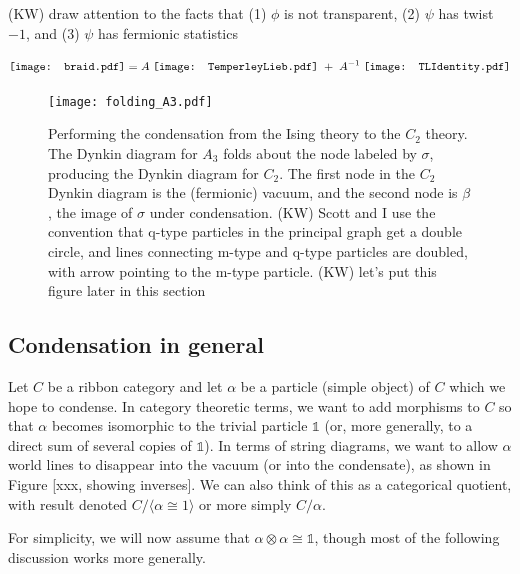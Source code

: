 \documentclass[12pt,a4paper]{article}
\newcounter{arrow}
\newcommand{\unit}{\mathds{1}}
\newcommand{\kw}[1]{{\color{kwcolor}\footnotesize{(KW) #1}}}
\begin{document}
\medskip

\kw{draw attention to the facts that (1) $\phi$ is not transparent, (2) $\psi$ has twist $-1$, 
and (3) $\psi$ has fermionic statistics}






\newcommand{\braid}{\mathord{\vcenter{\hbox{\texttt{[image: braid.pdf]}}}}}
\newcommand{\TLIdentity}{\mathord{\vcenter{\hbox{\texttt{[image: TLIdentity.pdf]}}}}}
\newcommand{\TemperleyLieb}{\mathord{\vcenter{\hbox{\texttt{[image: TemperleyLieb.pdf]}}}}}
  
\begin{align}
\braid = A\;  \TemperleyLieb \; +\;  A^{-1}\;  \TLIdentity
\end{align}

\begin{figure}
\texttt{[image: folding\_A3.pdf]}
\caption{Performing the condensation from the Ising theory to the $C_2$ theory. The Dynkin diagram for $A_3$ folds about the node labeled by $\sigma$, producing the Dynkin diagram 
for $C_2$. The first node in the $C_2$ Dynkin diagram is the (fermionic) vacuum, and the second node is $\beta$, the image of $\sigma$ under condensation.
\kw{Scott and I use the convention that q-type particles in the principal graph get a double circle, and lines connecting
m-type and q-type particles are doubled, with arrow pointing to the m-type particle.}
\kw{let's put this figure later in this section}
} 
\end{figure}



\subsection{Condensation in general}

Let $C$ be a ribbon category and let $\alpha$ be a particle (simple object) of $C$ which we hope to condense.
In category theoretic terms, we want to add morphisms to $C$ so that $\alpha$ becomes
isomorphic to the trivial particle $\unit$ (or, more generally, to a direct sum of several copies of $\unit$).
In terms of string diagrams, we want to allow $\alpha$ world lines to disappear into the vacuum (or into
the condensate), as shown in Figure [xxx, showing inverses].
We can also think of this as a categorical quotient, with result denoted $C/\langle \alpha \cong 1 \rangle$ or
more simply $C/\alpha$.

For simplicity, we will now assume that $\alpha\otimes\alpha\cong \unit$, 
though most of the following discussion works more generally.
\end{document}
